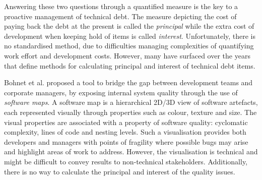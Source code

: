\documentclass{mprop}
\begin{document}
Answering these two questions through a quantified measure is the key to a
proactive management of technical debt. The measure depicting the cost of paying
back the debt at the present is called the \textit{principal} while the extra
cost of development when keeping hold of items is called \textit{interest}.
Unfortunately, there is no standardised method, due to difficulties managing
complexities of quantifying work effort and development costs. However, many
have surfaced over the years that define methods for calculating principal and
interest of technical debt items.

Bohnet et al. \cite{Bohnet2011} proposed a tool to bridge the gap between
development teams and corporate managers, by exposing internal system quality
through the use of \textit{software maps}. A software map is a hierarchical
2D/3D view of software artefacts, each represented visually through properties
such as colour, texture and size. The visual properties are associated with a
property of software quality: cyclomatic complexity, lines of code and nesting
levels. Such a visualisation provides both developers and managers with points
of fragility where possible bugs may arise and highlight areas of work to
address. However, the visualisation is technical and might be difficult to
convey results to non-technical stakeholders. Additionally, there is no way to
calculate the principal and interest of the quality issues.
\end{document}
